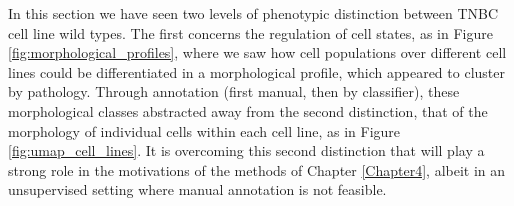 In this section we have seen two levels of phenotypic distinction between TNBC cell line wild types. The first concerns the regulation of cell states, as in Figure \ref{fig:morphological_profiles}, where we saw how cell populations over different cell lines could be differentiated in a morphological profile, which appeared to cluster by pathology. Through annotation (first manual, then by classifier), these morphological classes abstracted away from the second distinction, that of the morphology of individual cells within each cell line, as in Figure \ref{fig:umap_cell_lines}. It is overcoming this second distinction that will play a strong role in the motivations of the methods of Chapter \ref{Chapter4}, albeit in an unsupervised setting where manual annotation is not feasible.

%
%
%
%
%
%
%



